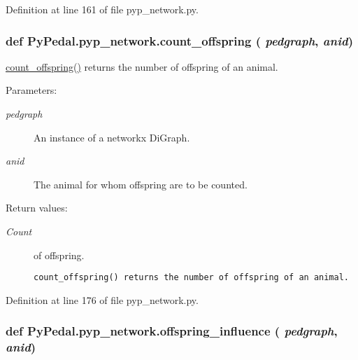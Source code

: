 Definition at line 161 of file pyp\_\-network.py.\hypertarget{namespacePyPedal_1_1pyp__network_3ccbd9df7f8267da05c78783e21a8288}{
\subsubsection[count\_\-offspring]{\setlength{\rightskip}{0pt plus 5cm}def Py\-Pedal.pyp\_\-network.count\_\-offspring ( {\em pedgraph},  {\em anid})}}
\label{namespacePyPedal_1_1pyp__network_3ccbd9df7f8267da05c78783e21a8288}


\hyperlink{namespacePyPedal_1_1pyp__network_3ccbd9df7f8267da05c78783e21a8288}{count\_\-offspring()} returns the number of offspring of an animal. 

\begin{Desc}
\item[Parameters:]
\begin{description}
\item[{\em pedgraph}]An instance of a networkx Di\-Graph. \item[{\em anid}]The animal for whom offspring are to be counted. \end{description}
\end{Desc}
\begin{Desc}
\item[Return values:]
\begin{description}
\item[{\em Count}]of offspring.

\footnotesize\begin{verbatim}count_offspring() returns the number of offspring of an animal.
\end{verbatim}
\normalsize
 \end{description}
\end{Desc}


Definition at line 176 of file pyp\_\-network.py.\hypertarget{namespacePyPedal_1_1pyp__network_ae9a5f01ef47449a3d35fb9fa8c12c39}{
\subsubsection[offspring\_\-influence]{\setlength{\rightskip}{0pt plus 5cm}def Py\-Pedal.pyp\_\-network.offspring\_\-influence ( {\em pedgraph},  {\em anid})}}
\label{namespacePyPedal_1_1pyp__network_ae9a5f01ef47449a3d35fb9fa8c12c39}


